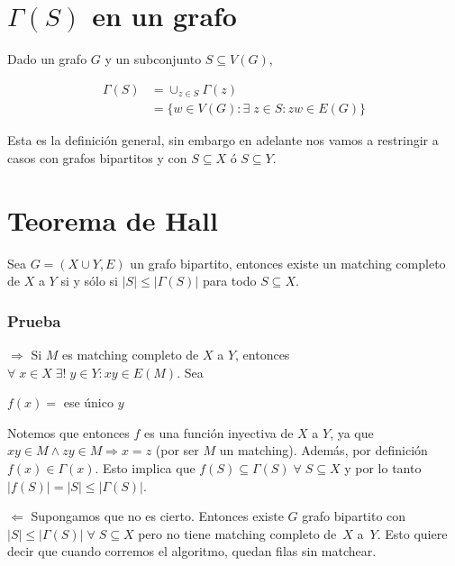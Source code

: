 \documentclass[10pt,a4paper]{article}
\begin{document}
\section*{$\Gamma(S)$ en un grafo}

Dado un grafo $G$ y un subconjunto $S \subseteq V(G)$,

\begin{center}
\begin{align*} \Gamma(S) &= \cup_{z \in S} \Gamma(z)\\ &= \{w \in V(G) : \exists \; z \in S : zw \in E(G)\} \end{align*}
\end{center}

Esta es la definición general, sin embargo en adelante nos vamos a restringir a casos con grafos bipartitos y con $S \subseteq X$ ó $S \subseteq Y$.

\section*{Teorema de Hall}

Sea $G = (X \cup Y, E)$ un grafo bipartito, entonces existe un matching completo de $X$ a $Y$ si y sólo si $\lvert S \rvert \leq \lvert \Gamma(S)\rvert$ para todo $S \subseteq X$.

\subsubsection*{Prueba}

$\Rightarrow$ Si $M$ es matching completo de $X$ a $Y$, entonces $\forall \; x \in X \;\exists!\; y \in Y: xy \in E(M)$. Sea

\begin{center}
$f(x) = $ ese único $y$
\end{center}

Notemos que entonces $f$ es una función inyectiva de $X $ a $Y$, ya que $xy\in M \land zy \in M \Rightarrow x = z$ (por ser $M$ un matching). Además, por definición $f(x) \in \Gamma(x)$. Esto implica que $f(S) \subseteq \Gamma(S) \; \forall \; S \subseteq X$ y por lo tanto $\lvert f(S)\rvert= \lvert S \rvert \leq \lvert \Gamma(S)\rvert$.

$\Leftarrow$ Supongamos que no es cierto. Entonces existe $G$ grafo bipartito con $\lvert S \rvert \leq \lvert \Gamma(S)\rvert\;\forall\;S \subseteq X$ pero no tiene matching completo de $X$ a $Y$. Esto quiere decir que cuando corremos el algoritmo, quedan filas sin matchear.
\end{document}
